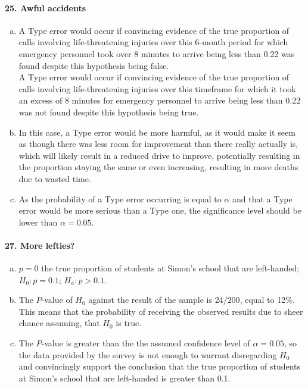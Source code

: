 \documentclass[12pt, A4]{article}
\renewcommand{\Roman}[1]{\MakeUppercase{\romannumeral #1}}
\begin{document}
		\paragraph{25. Awful accidents}
			\begin{enumerate}[a.]
				\item
					A Type \Roman{1} error would occur if convincing evidence of the true proportion of calls involving life-threatening injuries over this 6-month period for which emergency personnel took over 8 minutes to arrive being less than 0.22 was found despite this hypothesis being false. \\
					A Type \Roman{2} error would occur if convincing evidence of the true proportion of calls involving life-threatening injuries over this timeframe for which it took an excess of 8 minutes for emergency personnel to arrive being less than 0.22 was not found despite this hypothesis being true.
				\item
					In this case, a Type \Roman{1} error would be more harmful, as it would make it seem as though there was less room for improvement than there really actually is, which will likely result in a reduced drive to improve, potentially resulting in the proportion staying the same or even increasing, resulting in more deaths due to wasted time.
				\item
					As the probability of a Type \Roman{1} error occurring is equal to $\alpha$ and that a Type \Roman{1} error would be more serious than a Type \Roman{2} one, the significance level should be lower than $\alpha = 0.05$.
			\end{enumerate}
		\paragraph{27. More lefties?}
			\begin{enumerate}[a.]
				\item 
					$p = 0$ the true proportion of students at Simon's school that are left-handed; $H_0:p = 0.1$; $H_a:p > 0.1$.
				\item
					The $P$-value of $H_0$ against the result of the sample is $24/200$, equal to 12\%. This means that the probability of receiving the observed results due to sheer chance assuming, that $H_0$ is true.
				\item
					The $P$-value is greater than the the assumed confidence level of $\alpha = 0.05$, so the data provided by the survey is not enough to warrant disregarding $H_0$ and convincingly support the conclusion that the true proportion of students at Simon's school that are left-handed is greater than 0.1.
			\end{enumerate}
\end{document}
